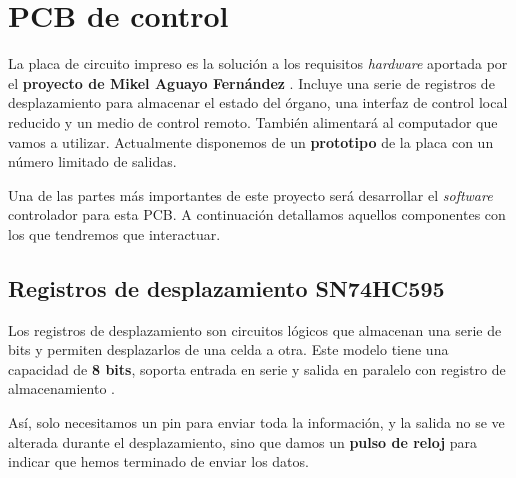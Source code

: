 \smallskip

\newpage

\section{PCB de control}

La placa de circuito impreso es la solución a los requisitos \textit{hardware} aportada por el \textbf{proyecto de Mikel Aguayo Fernández} \cite{mikel}. Incluye una serie de registros de desplazamiento para almacenar el estado del órgano, una interfaz de control local reducido y un medio de control remoto. También alimentará al computador que vamos a utilizar. Actualmente disponemos de un \textbf{prototipo} de la placa con un número limitado de salidas.

Una de las partes más importantes de este proyecto será desarrollar el \textit{software} controlador para esta \acrshort{PCB}. A continuación detallamos aquellos componentes con los que tendremos que interactuar.

\subsection{Registros de desplazamiento SN74HC595}

Los registros de desplazamiento son circuitos lógicos que almacenan una serie de bits y permiten desplazarlos de una celda a otra. Este modelo tiene una capacidad de \textbf{8 bits}, soporta entrada en serie y salida en paralelo con registro de almacenamiento \cite{shiftreg}. 

Así, solo necesitamos un pin para enviar toda la información, y la salida no se ve alterada durante el desplazamiento, sino que damos un \textbf{pulso de reloj} para indicar que hemos terminado de enviar los datos.

\smallskip

